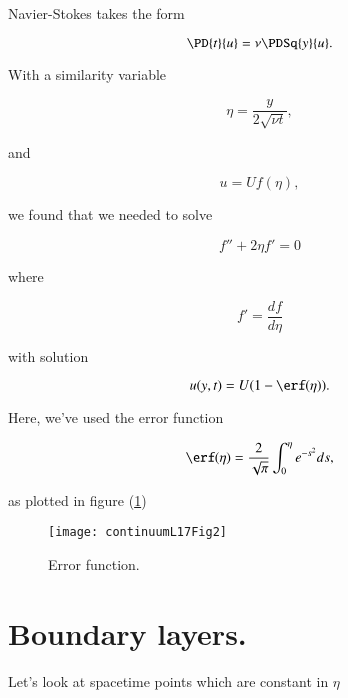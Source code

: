 Navier-Stokes takes the form

\begin{equation}\label{eqn:continuumL17:40}
\PD{t}{u} = \nu \PDSq{y}{u}.
\end{equation}

With a similarity variable

\begin{equation}\label{eqn:continuumL17:60}
\eta = \frac{y}{2 \sqrt{\nu t}},
\end{equation}

and 

\begin{equation}\label{eqn:continuumL17:80}
u = U f(\eta),
\end{equation}

we found that we needed to solve

\begin{equation}\label{eqn:continuumL17:100}
f'' + 2 \eta f' = 0
\end{equation}

where 

\begin{equation}\label{eqn:continuumL17:120}
f' = \frac{df}{d\eta}
\end{equation}

with solution

\begin{equation}\label{eqn:continuumL17:140}
u(y, t) = U(1 - \erf(\eta)).
\end{equation}

Here, we've used the error function

\begin{equation}\label{eqn:continuumL17:160}
\erf(\eta) = \frac{2}{\sqrt{\pi}} \int_0^\eta e^{-s^2} ds,
\end{equation}

as plotted in figure (\ref{fig:continuumL17:continuumL17Fig2})
\begin{figure}[htp]
   \centering
   \texttt{[image: continuumL17Fig2]}
   \caption{Error function.}\label{fig:continuumL17:continuumL17Fig2}
\end{figure}

\section{Boundary layers.}

Let's look at spacetime points which are constant in $\eta$

